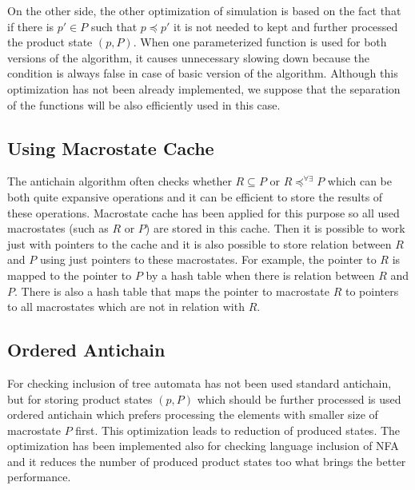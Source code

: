 On the other side, the other optimization of simulation is based on the fact that if there is $p' \in P$ such that $p \preceq p'$ 
it is not needed to kept and further processed the product state $(p,P)$. When one parameterized function is used for both versions of the algorithm, it 
causes unnecessary slowing down because the condition is always false in case of basic version of the algorithm. 
Although this optimization has not been already implemented, we suppose that the separation of the functions will be also 
efficiently used in this case.

\subsection{Using Macrostate Cache}
The antichain algorithm often checks whether $R \subseteq P$ or $R\preceq^{\forall\exists}P$ which can be both quite expansive operations and it can be
efficient to store the results of these operations. Macrostate cache has been applied for this purpose so all used macrostates (such as $R$ or $P$) 
are stored in this cache. Then it is possible to work just with pointers to the cache and it is also possible to store relation between $R$ and $P$ 
using just pointers to these macrostates. For example, 
the pointer to $R$ is mapped to the pointer to $P$ by a hash table when there is relation between $R$ and $P$. There is also a hash table that maps
the pointer to macrostate $R$ to pointers to all macrostates which are not in relation with $R$.

\subsection{Ordered Antichain}
For checking inclusion of tree automata has not been used standard antichain, but for storing product states $(p,P)$ which should be further processed
is used ordered antichain \cite{libvata} which prefers processing the elements with smaller size of macrostate $P$ first. This optimization leads to reduction
of produced states. The optimization has been implemented 
also for checking language inclusion of NFA and it reduces the number of produced product states too what brings the better performance.


